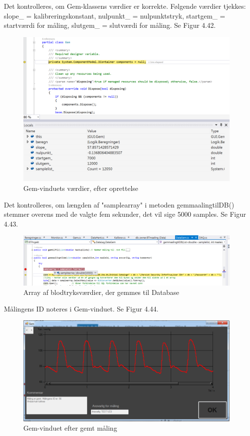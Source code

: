 Det kontrolleres, om Gem-klassens værdier er korrekte. Følgende værdier tjekkes: slope\_ = kalibreringskonstant, nulpunkt\_ = nulpunktstryk, startgem\_ = startværdi for måling, slutgem\_ = slutværdi for måling. Se Figur 4.42.

\begin{figure}[H]
	\centering
	\includegraphics[width=1\textwidth]{Figurer/UC6_Vardier}
	\caption{Gem-vinduets værdier, efter oprettelse}
\end{figure}

Det kontrolleres, om længden af "samplearray" i metoden gemmaalingtilDB() stemmer overens med de valgte fem sekunder, det vil sige 5000 samples. Se Figur 4.43.

\begin{figure}[H]
	\centering
	\includegraphics[width=1\textwidth]{Figurer/UC6_Samplearray}
	\caption{Array af blodtryksværdier, der gemmes til Database}
\end{figure}

Målingens ID noteres i Gem-vinduet. Se Figur 4.44.

\begin{figure}[H]
	\centering
	\includegraphics[width=1\textwidth]{Figurer/UC6_MalSuc}
	\caption{Gem-vinduet efter gemt måling}
\end{figure}


